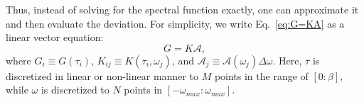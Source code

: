 \documentclass[final,5p,twocolumn,12pt]{elsarticle}
\begin{document}
Thus, instead of solving for the spectral function exactly, one can approximate it and then evaluate the deviation. For simplicity, we write Eq.~\ref{eq:G=KA} as a linear vector equation: 
\begin{equation}
G= K\mathcal{A},
\end{equation}
where $G_i\equiv G(\tau_i)$, $K_{ij}\equiv K(\tau_i,\omega_j)$, and $\mathcal{A}_j \equiv \mathcal{A}(\omega_j)\Delta\omega$. Here, $\tau$ is discretized in linear or non-linear manner to $M$ points in the range of $[0:\beta]$, while $\omega$ is discretized to $N$ points in $[-\omega_{max}:\omega_{max}]$. 





\label{}













\end{document}
